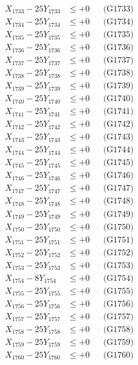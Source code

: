 \documentclass[a4paper,10pt]{article}
\begin{document}
{\begin{align}
X_{1733} - 25Y_{1733} &\leq +0 && \text{(G1733)} \\
X_{1734} - 25Y_{1734} &\leq +0 && \text{(G1734)} \\
X_{1735} - 25Y_{1735} &\leq +0 && \text{(G1735)} \\
X_{1736} - 25Y_{1736} &\leq +0 && \text{(G1736)} \\
X_{1737} - 25Y_{1737} &\leq +0 && \text{(G1737)} \\
X_{1738} - 25Y_{1738} &\leq +0 && \text{(G1738)} \\
X_{1739} - 25Y_{1739} &\leq +0 && \text{(G1739)} \\
X_{1740} - 25Y_{1740} &\leq +0 && \text{(G1740)} \\
\allowbreak
X_{1741} - 25Y_{1741} &\leq +0 && \text{(G1741)} \\
X_{1742} - 25Y_{1742} &\leq +0 && \text{(G1742)} \\
X_{1743} - 25Y_{1743} &\leq +0 && \text{(G1743)} \\
X_{1744} - 25Y_{1744} &\leq +0 && \text{(G1744)} \\
X_{1745} - 25Y_{1745} &\leq +0 && \text{(G1745)} \\
X_{1746} - 25Y_{1746} &\leq +0 && \text{(G1746)} \\
X_{1747} - 25Y_{1747} &\leq +0 && \text{(G1747)} \\
X_{1748} - 25Y_{1748} &\leq +0 && \text{(G1748)} \\
X_{1749} - 25Y_{1749} &\leq +0 && \text{(G1749)} \\
X_{1750} - 25Y_{1750} &\leq +0 && \text{(G1750)} \\
\allowbreak
X_{1751} - 25Y_{1751} &\leq +0 && \text{(G1751)} \\
X_{1752} - 25Y_{1752} &\leq +0 && \text{(G1752)} \\
X_{1753} - 25Y_{1753} &\leq +0 && \text{(G1753)} \\
X_{1754} - 8Y_{1754} &\leq +0 && \text{(G1754)} \\
X_{1755} - 25Y_{1755} &\leq +0 && \text{(G1755)} \\
X_{1756} - 25Y_{1756} &\leq +0 && \text{(G1756)} \\
X_{1757} - 25Y_{1757} &\leq +0 && \text{(G1757)} \\
X_{1758} - 25Y_{1758} &\leq +0 && \text{(G1758)} \\
X_{1759} - 25Y_{1759} &\leq +0 && \text{(G1759)} \\
X_{1760} - 25Y_{1760} &\leq +0 && \text{(G1760)} \\
\allowbreak

\end{align}}
\end{document}
